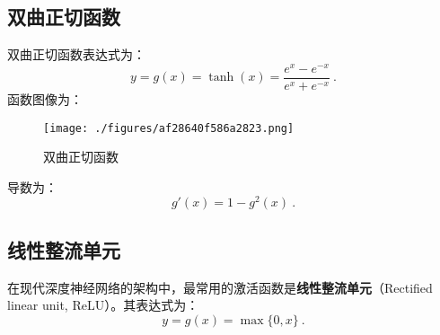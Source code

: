 \subsection{双曲正切函数}
双曲正切函数表达式为：
\begin{equation}
y=g(x)=\tanh(x)=\frac{e^x-e^{-x}}{e^x+e^{-x}}~.
\end{equation}
函数图像为：
\begin{figure}[ht]
\centering
\texttt{[image: ./figures/af28640f586a2823.png]}
\caption{双曲正切函数} \label{fig_ActFun3}
\end{figure}
导数为：
\begin{equation}
g'(x)=1-g^2(x)~.
\end{equation}

\subsection{线性整流单元}
在现代深度神经网络的架构中，最常用的激活函数是\textbf{线性整流单元}（Rectified linear unit, ReLU）。其表达式为：
\begin{equation}
y=g(x)=\max\{0,x\}~.
\end{equation}
